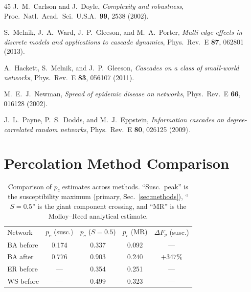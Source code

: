\documentclass[aps,pre,twocolumn,superscriptaddress,showpacs]{revtex4-2}
\newcommand{\pc}{p_c}
\newcommand{\DF}{\Delta F}
\begin{document}
\begin{thebibliography}{45}
J.~M.~Carlson and J.~Doyle,
\emph{Complexity and robustness},
Proc.\ Natl.\ Acad.\ Sci.\ U.S.A.\ \textbf{99}, 2538 (2002).

S.~Melnik, J.~A.~Ward, J.~P.~Gleeson, and M.~A.~Porter,
\emph{Multi-edge effects in discrete models and applications to cascade dynamics},
Phys.\ Rev.\ E \textbf{87}, 062801 (2013).

A.~Hackett, S.~Melnik, and J.~P.~Gleeson,
\emph{Cascades on a class of small-world networks},
Phys.\ Rev.\ E \textbf{83}, 056107 (2011).

M.~E.~J.~Newman,
\emph{Spread of epidemic disease on networks},
Phys.\ Rev.\ E \textbf{66}, 016128 (2002).

J.~L.~Payne, P.~S.~Dodds, and M.~J.~Eppstein,
\emph{Information cascades on degree-correlated random networks},
Phys.\ Rev.\ E \textbf{80}, 026125 (2009).

\end{thebibliography}

\appendix

\section{Percolation Method Comparison}
\label{app:percolation}

\begin{table}[h]
\caption{Comparison of $\pc$ estimates across methods. ``Susc.\ peak'' is the susceptibility maximum (primary, Sec.~\ref{sec:methods}), ``$S=0.5$'' is the giant component crossing, and ``MR'' is the Molloy--Reed analytical estimate.}
\label{tab:pc_compare}
\begin{ruledtabular}
\begin{tabular}{lcccc}
\textrm{Network} & $\pc$ (susc.) & $\pc$ ($S=0.5$) & $\pc$ (MR) & $\DF_p$ (susc.) \\
\colrule
BA before & 0.174 & 0.337 & 0.092 & --- \\
BA after & 0.776 & 0.903 & 0.240 & $+347\%$ \\
ER before & --- & 0.354 & 0.251 & --- \\
WS before & --- & 0.499 & 0.323 & --- \\
\end{tabular}
\end{ruledtabular}
\end{table}
\end{document}
